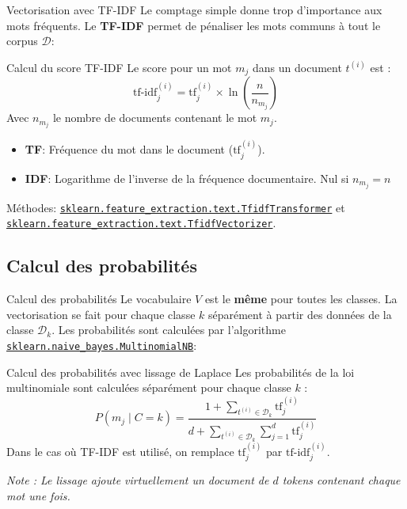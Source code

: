 \begin{frame}{Vectorisation avec TF-IDF}
	Le comptage simple donne trop d'importance aux mots fréquents. Le \textbf{TF-IDF} permet de pénaliser les mots communs à tout le corpus $\mathcal{D}$:
	\begin{block}{Calcul du score TF-IDF}
		Le score pour un mot $m_j$ dans un document $t^{(i)}$ est :
		\begin{equation}
			\text{tf-idf}_j^{(i)} = \text{tf}_j^{(i)} \times \ln\left( \frac{n}{n_{m_j}} \right)
			\nonumber
		\end{equation}
		Avec $n_{m_j}$ le nombre de documents contenant le mot $m_j$.
	\end{block}
	\begin{itemize}
		\item \textbf{TF}: Fréquence du mot dans le document ($\text{tf}^{(i)}_j$).
		\item \textbf{IDF}: Logarithme de l'inverse de la fréquence documentaire. Nul si $n_{m_j} = n$
	\end{itemize}
	\vfill
	Méthodes: \href{https://scikit-learn.org/stable/modules/generated/sklearn.feature_extraction.text.TfidfTransformer.html}{\texttt{sklearn.feature\_extraction.text.TfidfTransformer}} et \href{https://scikit-learn.org/stable/modules/generated/sklearn.feature_extraction.text.TfidfVectorizer.html}{\texttt{sklearn.feature\_extraction.text.TfidfVectorizer}}.
\end{frame}

\subsection[Calcul des probabilités]{Calcul des probabilités}

\begin{frame}{Calcul des probabilités}
	Le vocabulaire $V$ est le \textbf{même} pour toutes les classes. La vectorisation se fait pour chaque classe $k$ séparément à partir des données de la classe $\mathcal{D}_k$. Les probabilités sont calculées par l'algorithme \href{https://scikit-learn.org/stable/modules/generated/sklearn.naive_bayes.MultinomialNB.html}{\texttt{sklearn.naive\_bayes.MultinomialNB}}:
	\begin{block}{Calcul des probabilités avec lissage de Laplace}
		Les probabilités de la loi multinomiale sont calculées séparément pour chaque classe $k$ :
		\begin{equation}
			P(m_j \mid C = k) = \frac{1 + \underset{t^{(i)} \in \mathcal{D}_k}{\sum} \text{tf}^{(i)}_j}{d + \underset{t^{(i)} \in \mathcal{D}_k}{\sum} \sum_{j=1}^d \text{tf}^{(i)}_j}
			\nonumber
		\end{equation}
		Dans le cas où TF-IDF est utilisé, on remplace $\text{tf}^{(i)}_j$ par $\text{tf-idf}^{(i)}_j$.
	\end{block}
	\textit{Note : Le lissage ajoute virtuellement un document de $d$ tokens contenant chaque mot une fois.}
\end{frame}

